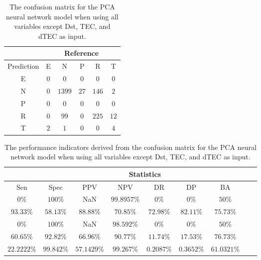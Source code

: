 \begin{table}[!ht]
	\centering
	\begin{tabular}{|c|c|c|c|c|c|}
		\hline
		 & \multicolumn{5}{|c|}{Reference} \\ \hline
		 Prediction & E & N & P & R & T \\ \hline
		 E & $0$ & $0$ & $0$ & $0$ & $0$ \\ \hline
		 N & $0$ & $1399$ & $27$ & $146$ & $2$ \\ \hline
		 P & $0$ & $0$ & $0$ & $0$ & $0$ \\ \hline
		 R & $0$ & $99$ & $0$ & $225$ & $12$ \\ \hline
		 T & $2$ & $1$ & $0$ & $0$ & $4$ \\ \hline
	\end{tabular}
	\caption{The confusion matrix for the PCA neural network model when using all variables except Dst, TEC, and dTEC as input.}
	\label{tab:cm:noTEC:pcaNNet}
\end{table}

\begin{table}[!ht]
	\centering
	\begin{tabular}{|c|c|c|c|c|c|c|c|c|}
		\hline
		 & \multicolumn{7}{c|}{Statistics} \\ \hline
		Sen & Spec & PPV & NPV & DR & DP & BA \\ \hline
		$0\%$ & $100\%$ & NaN & $99.8957\%$ & $0\%$ & $0\%$ & $50\%$ \\ \hline
		$93.33\%$ & $58.13\%$ & $88.88\%$ & $70.85\%$ & $72.98\%$ & $82.11\%$ & $75.73\%$ \\ \hline
		$0\%$ & $100\%$ & NaN & $98.592\%$ & $0\%$ & $0\%$ & $50\%$ \\ \hline
		$60.65\%$ & $92.82\%$ & $66.96\%$ & $90.77\%$ & $11.74\%$ & $17.53\%$ & $76.73\%$ \\ \hline
		$22.2222\%$ & $99.842\%$ & $57.1429\%$ & $99.267\%$ & $0.2087\%$ & $0.3652\%$ & $61.0321\%$ \\ \hline
	\end{tabular}
	\caption{The performance indicators derived from the confusion matrix for the PCA neural network model when using all variables except Dst, TEC, and dTEC as input.}
	\label{tab:cs:noTEC:pcaNNet}
\end{table}

